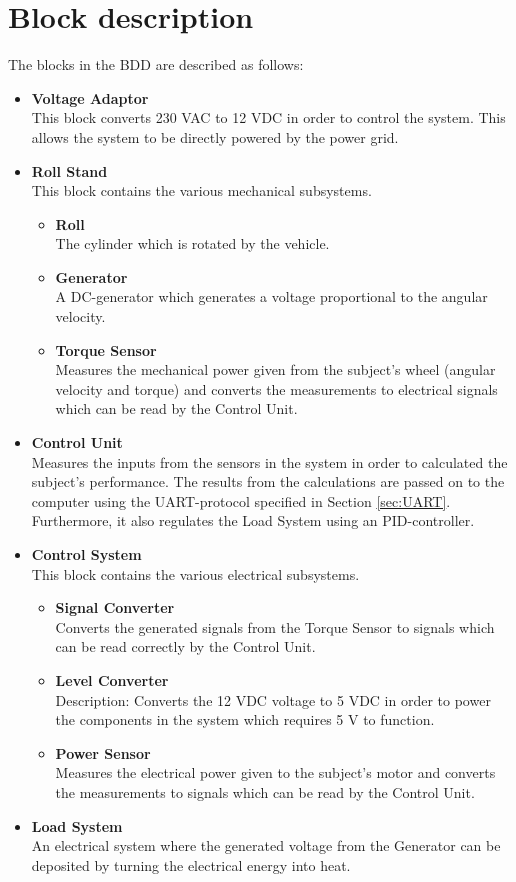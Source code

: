 \newpage
\section{Block description}
The blocks in the BDD are described as follows:
\begin{itemize}
	\item \textbf{Voltage Adaptor}\\
	This block converts 230 VAC to 12 VDC in order to control the system. This allows the system to be directly powered by the power grid.
	\item \textbf{Roll Stand}\\
	This block contains the various mechanical subsystems.
	\begin{itemize}
		\item \textbf{Roll}\\
		The cylinder which is rotated by the vehicle.
		\item \textbf{Generator}\\
		A DC-generator which generates a voltage proportional to the angular velocity.
		\item \textbf{Torque Sensor}\\
		Measures the mechanical power given from the subject's wheel (angular velocity and torque) and converts the measurements to electrical signals which can be read by the Control Unit.
	\end{itemize}
	\item \textbf{Control Unit}\\
	Measures the inputs from the sensors in the system in order to calculated the subject's performance. The results from the calculations are passed on to the computer using the UART-protocol specified in Section \vref{sec:UART}. Furthermore, it also regulates the Load System using an PID-controller.
	\item \textbf{Control System} \\
	This block contains the various electrical subsystems.
	\begin{itemize}
		\item \textbf{Signal Converter}\\
		Converts the generated signals from the Torque Sensor to signals which can be read correctly by the Control Unit.
		\item \textbf{Level Converter}\\
		Description: Converts the 12 VDC voltage to 5 VDC in order to power the components in the system which requires 5 V to function.
		\item \textbf{Power Sensor}\\
		Measures the electrical power given to the subject's motor and converts the measurements to signals which can be read by the Control Unit.
	\end{itemize}
	\item \textbf{Load System}\\
	An electrical system where the generated voltage from the Generator can be deposited by turning the electrical energy into heat.
\end{itemize}